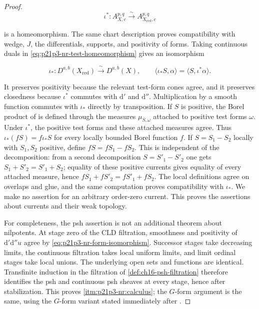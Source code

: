 \begin{proof}
\begin{equation}
\label{eq:p21p3-nr-test-homeomorphism}
 \iota^*:A^{p,q}_{X,c}\xrightarrow{\ \sim\ }
                         A^{p,q}_{X_{\mathrm{red}},c}
\end{equation}

is a homeomorphism.  The same chart description proves compatibility with
wedge, \(J\), the differentials, supports, and positivity of forms.  Taking
continuous duals in \eqref{eq:p21p3-nr-test-homeomorphism} gives an
isomorphism

\begin{equation}
\label{eq:p21p3-nr-current-isomorphism}
 \iota_*:D^{a,b}(X_{\mathrm{red}})
              \xrightarrow{\ \sim\ }D^{a,b}(X),
 \qquad
 \langle\iota_*S,\alpha\rangle
       =\langle S,\iota^*\alpha\rangle .
\end{equation}

It preserves positivity because the relevant test-form cones agree, and
it preserves closedness because \(\iota^*\) commutes with
\(\mathrm d'\) and \(\mathrm d''\).  Multiplication by a smooth function
commutes with \(\iota_*\) directly by transposition.  If \(S\) is positive,
the Borel product of \cite[Example~7.2.12]{CLD25} is defined through the
measures \(\mu_{S,\omega}\) attached to positive test forms \(\omega\).
Under \(\iota^*\), the positive test forms and these attached measures agree.
Thus \(\iota_*(fS)=f\iota_*S\) for every locally bounded Borel function
\(f\).  If \(S=S_1-S_2\) locally with \(S_1,S_2\) positive, define
\(fS=fS_1-fS_2\).  This is independent of the decomposition: from a second
decomposition \(S=S'_1-S'_2\) one gets
\(S_1+S'_2=S'_1+S_2\); equality of these positive currents gives equality
of every attached measure, hence
\(fS_1+fS'_2=fS'_1+fS_2\).  The local definitions agree on overlaps and
glue, and the same computation proves compatibility with \(\iota_*\).  We
make no assertion for an arbitrary order-zero current.
This proves the assertions about currents and their weak topology.

For completeness, the psh assertion is not an additional theorem about
nilpotents.  At stage zero of the CLD filtration, smoothness and positivity
of \(\mathrm d'\mathrm d''u\) agree by
\eqref{eq:p21p3-nr-form-isomorphism}.  Successor stages take decreasing
limits, the continuous filtration takes local uniform limits, and limit
ordinal stages take local unions.  The underlying open sets and functions
are identical.  Transfinite induction in the filtration of
\cref{def:ch16-psh-filtration} therefore identifies the psh and continuous
psh sheaves at every stage, hence after stabilization.  This proves
\cref{itm:p21p3-nr:calculus}; the \(G\)-form argument is the same, using the
\(G\)-form variant stated immediately after
\cite[Proposition~15.1.3]{CLD25}.


\end{proof}
